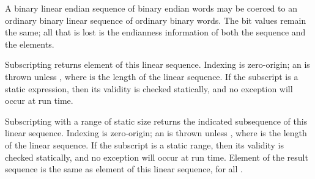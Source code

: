 A binary linear endian sequence of binary endian words may be coerced
to an ordinary binary linear sequence of ordinary binary words.  The bit values remain the same;
all that is lost is the endianness information of both the sequence and the elements.



Subscripting returns element  of this linear sequence.
Indexing is zero-origin; an  is thrown unless ,
where  is the length of the linear sequence.
If the subscript is a static expression, then its validity is checked statically,
and no exception will occur at run time.



Subscripting with a range of static size  returns the indicated subsequence of this linear sequence.
Indexing is zero-origin;
an  is thrown unless ,
where  is the length of the linear sequence.
If the subscript is a static range, then its validity is checked statically,
and no exception will occur at run time.
Element  of the result sequence is the same as
element  of this linear sequence, for all .



